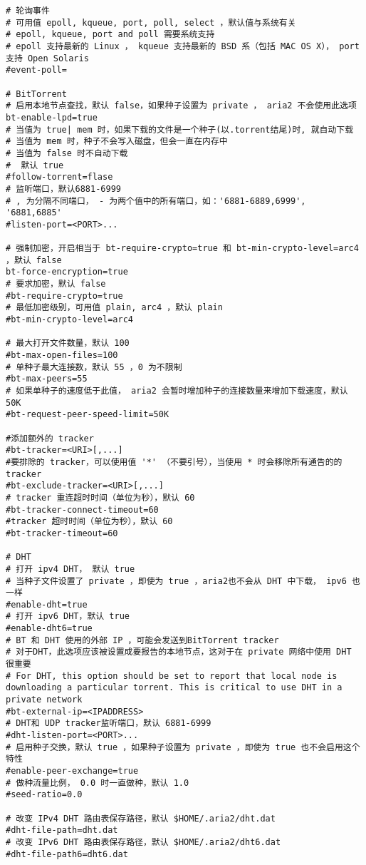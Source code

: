 \documentclass[11pt]{article}
\begin{document}
\begin{lstlisting}
# 轮询事件
# 可用值 epoll, kqueue, port, poll, select ，默认值与系统有关
# epoll, kqueue, port and poll 需要系统支持
# epoll 支持最新的 Linux ， kqueue 支持最新的 BSD 系（包括 MAC OS X）， port 支持 Open Solaris
#event-poll=

# BitTorrent
# 启用本地节点查找，默认 false，如果种子设置为 private ， aria2 不会使用此选项
bt-enable-lpd=true
# 当值为 true| mem 时，如果下载的文件是一个种子(以.torrent结尾)时, 就自动下载
# 当值为 mem 时，种子不会写入磁盘，但会一直在内存中
# 当值为 false 时不自动下载
#  默认 true
#follow-torrent=flase
# 监听端口，默认6881-6999
# , 为分隔不同端口， - 为两个值中的所有端口，如：'6881-6889,6999', '6881,6885'
#listen-port=<PORT>...

# 强制加密，开启相当于 bt-require-crypto=true 和 bt-min-crypto-level=arc4 ，默认 false
bt-force-encryption=true
# 要求加密，默认 false
#bt-require-crypto=true
# 最低加密级别，可用值 plain, arc4 ，默认 plain
#bt-min-crypto-level=arc4

# 最大打开文件数量，默认 100
#bt-max-open-files=100
# 单种子最大连接数，默认 55 ，0 为不限制
#bt-max-peers=55
# 如果单种子的速度低于此值， aria2 会暂时增加种子的连接数量来增加下载速度，默认 50K
#bt-request-peer-speed-limit=50K

#添加额外的 tracker
#bt-tracker=<URI>[,...]
#要排除的 tracker，可以使用值 '*' （不要引号），当使用 * 时会移除所有通告的的 tracker
#bt-exclude-tracker=<URI>[,...]
# tracker 重连超时时间（单位为秒），默认 60
#bt-tracker-connect-timeout=60
#tracker 超时时间（单位为秒），默认 60
#bt-tracker-timeout=60

# DHT
# 打开 ipv4 DHT， 默认 true
# 当种子文件设置了 private ，即使为 true ，aria2也不会从 DHT 中下载， ipv6 也一样
#enable-dht=true
# 打开 ipv6 DHT，默认 true
#enable-dht6=true
# BT 和 DHT 使用的外部 IP ，可能会发送到BitTorrent tracker
# 对于DHT，此选项应该被设置成要报告的本地节点，这对于在 private 网络中使用 DHT 很重要
# For DHT, this option should be set to report that local node is downloading a particular torrent. This is critical to use DHT in a private network
#bt-external-ip=<IPADDRESS>
# DHT和 UDP tracker监听端口，默认 6881-6999
#dht-listen-port=<PORT>...
# 启用种子交换，默认 true ，如果种子设置为 private ，即使为 true 也不会启用这个特性
#enable-peer-exchange=true
# 做种流量比例， 0.0 时一直做种，默认 1.0
#seed-ratio=0.0

# 改变 IPv4 DHT 路由表保存路径，默认 $HOME/.aria2/dht.dat
#dht-file-path=dht.dat
# 改变 IPv6 DHT 路由表保存路径，默认 $HOME/.aria2/dht6.dat
#dht-file-path6=dht6.dat


\end{lstlisting}
\end{document}
